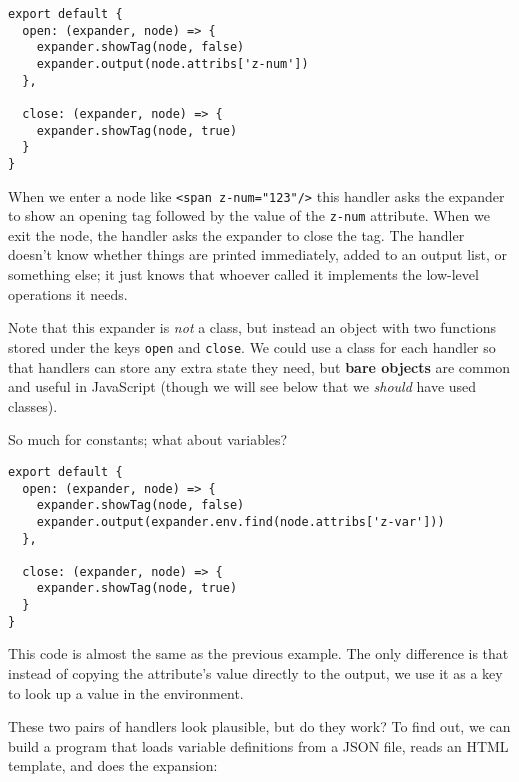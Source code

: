 \documentclass[krantzl]{krantz}
\newcommand{\glossref}[1]{\textbf{#1}}
\begin{document}
\begin{lstlisting}[frame=single,frameround=tttt]
export default {
  open: (expander, node) => {
    expander.showTag(node, false)
    expander.output(node.attribs['z-num'])
  },

  close: (expander, node) => {
    expander.showTag(node, true)
  }
}
\end{lstlisting}



\noindent When we enter a node like \texttt{<span z-num="123"/>}
this handler asks the expander to show an opening tag
followed by the value of the \texttt{z-num} attribute.
When we exit the node,
the handler asks the expander to close the tag.
The handler doesn't know whether things are printed immediately,
added to an output list,
or something else;
it just knows that whoever called it implements the low-level operations it needs.


Note that this expander is \emph{not} a class,
but instead an object with two functions stored under the keys \texttt{open} and \texttt{close}.
We could use a class for each handler
so that handlers can store any extra state they need,
but \glossref{bare objects} are common and useful in JavaScript
(though we will see below that we \emph{should} have used classes).


So much for constants; what about variables?


\begin{lstlisting}[frame=single,frameround=tttt]
export default {
  open: (expander, node) => {
    expander.showTag(node, false)
    expander.output(expander.env.find(node.attribs['z-var']))
  },

  close: (expander, node) => {
    expander.showTag(node, true)
  }
}
\end{lstlisting}



\noindent This code is almost the same as the previous example.
The only difference is that instead of copying the attribute's value
directly to the output,
we use it as a key to look up a value in the environment.


These two pairs of handlers look plausible, but do they work?
To find out,
we can build a program that loads variable definitions from a JSON file,
reads an HTML template,
and does the expansion:
\end{document}
